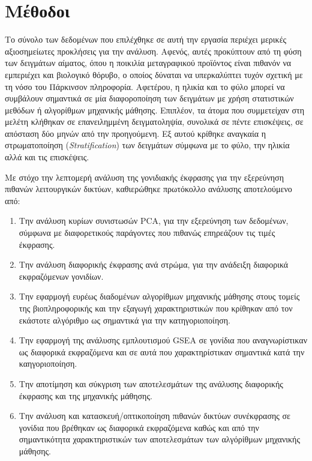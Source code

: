 \documentclass[12pt]{report}
\begin{document}
    \section{Μέθοδοι}
        \par
            Το σύνολο των δεδομένων που επιλέχθηκε σε αυτή την εργασία περιέχει μερικές αξιοσημείωτες προκλήσεις για την ανάλυση. Αφενός, αυτές προκύπτουν από τη φύση των δειγμάτων αίματος, όπου η ποικιλία μεταγραφικού προϊόντος είναι πιθανόν να εμπεριέχει και βιολογικό θόρυβο, ο οποίος δύναται να υπερκαλύπτει τυχόν σχετική με τη νόσο του Πάρκινσον πληροφορία. Αφετέρου, η ηλικία και το φύλο μπορεί να συμβάλουν σημαντικά σε μία διαφοροποίηση των δειγμάτων με χρήση στατιστικών μεθόδων ή αλγορίθμων μηχανικής μάθησης. Επιπλέον, τα άτομα που συμμετείχαν στη μελέτη κλήθηκαν σε επανειλημμένη δειγματοληψία, συνολικά σε πέντε επισκέψεις, σε απόσταση δύο μηνών από την προηγούμενη. Εξ αυτού κρίθηκε αναγκαία η στρωματοποίηση (\emph{Stratification}) των δειγμάτων σύμφωνα με το φύλο, την ηλικία αλλά και τις επισκέψεις.
        \par
            Με στόχο την λεπτομερή ανάλυση της γονιδιακής έκφρασης για την εξερεύνηση πιθανών λειτουργικών δικτύων, καθιερώθηκε πρωτόκολλο ανάλυσης αποτελούμενο από:
            \begin{enumerate}
                \item Την ανάλυση κυρίων συνιστωσών PCA, για την εξερεύνηση των δεδομένων, σύμφωνα με διαφορετικούς παράγοντες που πιθανώς επηρεάζουν τις τιμές έκφρασης.
                \item Την ανάλυση διαφορικής έκφρασης ανά στρώμα, για την ανάδειξη διαφορικά εκφραζόμενων γονιδίων.
                \item Την εφαρμογή ευρέως διαδομένων αλγορίθμων μηχανικής μάθησης στους τομείς της βιοπληροφορικής και την εξαγωγή χαρακτηριστικών που κρίθηκαν από τον εκάστοτε αλγόριθμο ως σημαντικά για την κατηγοριοποίηση.
                \item Την εφαρμογή της ανάλυσης εμπλουτισμού GSEA σε γονίδια που αναγνωρίστικαν ως διαφορικά εκφραζόμενα και σε αυτά που χαρακτηρίστικαν σημαντικά κατά την καηγοριοποίηση.
                \item Την αποτίμηση και σύκγριση των αποτελεσμάτων της ανάλυσης διαφορικής έκφρασης και της μηχανικής μάθησης.
                \item Την ανάλυση και κατασκευή/οπτικοποίηση πιθανών δικτύων συνέκφρασης σε γονίδια που βρέθηκαν ως διαφορικά εκφραζόμενα καθώς και από την σημαντικότητα χαρακτηριστικών των αποτελεσμάτων των αλγόρίθμων μηχανικής μάθησης.
            \end{enumerate}
\end{document}
